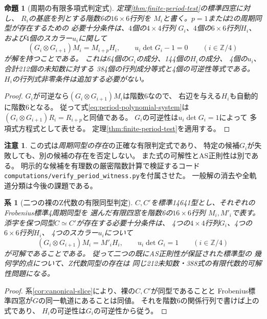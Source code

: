 \documentclass[11pt,a4paper]{ltjsarticle}
\newtheorem{proposition}[theorem]{命題}
\newtheorem{corollary}[theorem]{系}
\theoremstyle{definition}
\newtheorem{remark}[theorem]{注意}
\newcommand{\ZZ}{\mathbb Z}
\begin{document}
\begin{proposition}[周期の有限多項式判定式]\label{prop:period-polynomial-system}
定理\ref{thm:finite-period-test}の標準四窓に対し、
$R_i$の基底を列とする階数6の$16\times6$行列を
$M_i$と書く。$p=1$または$2$の周期同型が存在するための
必要十分条件は、$4$個の$4\times4$行列
$G_i$、$4$個の$6\times6$行列$H_i$、
および$4$個のスカラー$u_i$に関して
\begin{equation}\label{eq:period-polynomial-system}
 (G_i\otimes G_{i+1})M_i=M_{i+p}H_i,\qquad
 u_i\det G_i-1=0\qquad(i\in\ZZ/4)
\end{equation}
が解を持つことである。
これは64個の$G_i$の成分、144個の$H_i$の成分、
4個の$u_i$、合計212個の未知数に対する
384個の行列成分等式と4個の可逆性等式である。
$H_i$の行列式非零条件は追加する必要がない。
\end{proposition}
\begin{proof}
$G_i$が可逆なら$(G_i\otimes G_{i+1})M_i$は階数6なので、
右辺を与える$H_i$も自動的に階数6となる。
従って式\eqref{eq:period-polynomial-system}は
$(G_i\otimes G_{i+1})R_i=R_{i+p}$と同値である。
$G_i$の可逆性は$u_i\det G_i=1$によって
多項式方程式として表せる。
定理\ref{thm:finite-period-test}を適用する。
\end{proof}
\begin{remark}
この式は\emph{周期同型の存在}の正確な有限判定式であり、
特定の候補$G_i$が失敗しても、別の候補の存在を否定しない。
また式の可解性とAS正則性は別である。
明示的な候補を有理数の厳密階数計算で検証するコード
\texttt{computations/verify\_period\_witness.py}を付属させた。
一般解の消去や全軌道分類は今後の課題である。
\end{remark}

\begin{corollary}[二つの裸のZ代数の有限同型判定]\label{cor:finite-isom-test}
$C,C'$を標準14641型とし、それぞれのFrobenius標準4周期同型を
選んだ有限四窓を階数6の$16\times6$行列
$M_i,M'_i$で表す。
\emph{添字を保つ}同型$C\simeq C'$が存在する必要十分条件は、
4つの$4\times4$行列$G_i$、4つの$6\times6$行列$H_i$、
4つのスカラー$u_i$について
\[
 (G_i\otimes G_{i+1})M_i=M'_iH_i,\qquad
 u_i\det G_i=1\qquad(i\in\ZZ/4)
\]
が可解であることである。
従って二つの\emph{既にAS正則性が保証された}標準型の
幾何学的点について、Z代数同型の存在は
同じ212未知数・388式の有限代数的可解性問題になる。
\end{corollary}
\begin{proof}
系\ref{cor:canonical-slice}により、裸の$C,C'$が同型であることと
Frobenius標準四窓が$G$の同一軌道にあることは同値。
それを階数6の関係行列で書けば上の式であり、
$H_i$の可逆性は$G_i$の可逆性から従う。
\end{proof}
\end{document}
